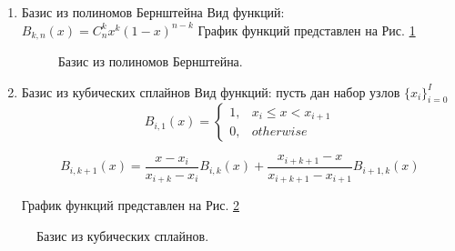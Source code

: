 \documentclass{config}
\begin{document}
\begin{enumerate}
    \item Базис из полиномов Бернштейна\newline
Вид функций: $B_{k, n}(x) = C_n^k x^k (1-x)^{n-k}$ \newline
График функций представлен на Рис. \ref{basis_bernstein}

\begin{figure}[h!]
    \caption{Базис из полиномов Бернштейна.}
    \label{basis_bernstein}
\end{figure}

    \item Базис из кубических сплайнов\newline
Вид функций: пусть дан набор узлов $\{x_i\}_{i=0}^I$
\begin{equation}
    B_{i, 1}(x) = 
    \begin{cases}
    1, & x_i \leq x < x_{i+1}\\
    0, & otherwise
    \end{cases}
\end{equation}

\begin{equation}
    B_{i, k+1}(x) = \frac{x - x_i}{x_{i+k} - x_i} B_{i, k}(x) + \frac{x_{i+k+1} - x}{x_{i+k+1} - x_{i+1}} B_{i+1, k}(x)
\end{equation}

График функций представлен на Рис. \ref{basis_cubic}
\end{enumerate}

\begin{figure}[h!]
    \caption{Базис из кубических сплайнов.}
    \label{basis_cubic}
\end{figure}

\clearpage

\printbibliography[
heading=bibintoc,
title={Список литературы}
]
\end{document}
